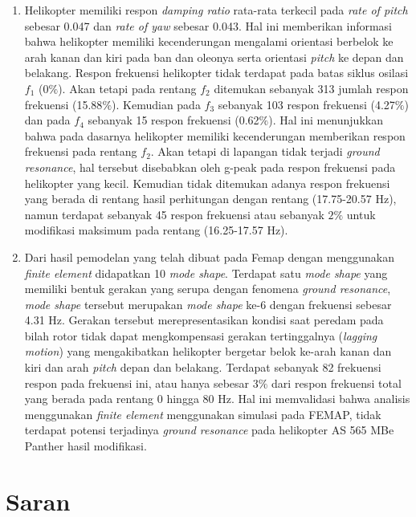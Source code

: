 \begin{enumerate}[nolistsep]
	\item Helikopter memiliki respon \textit{damping ratio} rata-rata terkecil pada \textit{rate of pitch} sebesar 0.047 dan \textit{rate of yaw} sebesar 0.043. Hal ini memberikan informasi bahwa helikopter memiliki kecenderungan mengalami orientasi berbelok ke arah kanan dan kiri pada ban dan oleonya serta orientasi \textit{pitch} ke depan dan belakang. Respon frekuensi helikopter tidak terdapat pada batas siklus osilasi $f_1$ (0$\%$). Akan tetapi pada rentang $f_2$ ditemukan sebanyak 313 jumlah respon frekuensi (15.88$\%$). Kemudian pada $f_3$ sebanyak 103 respon frekuensi (4.27$\%$) dan pada $f_4$ sebanyak 15 respon frekuensi (0.62$\%$). Hal ini menunjukkan bahwa pada dasarnya helikopter memiliki kecenderungan memberikan respon frekuensi pada rentang $f_2$. Akan tetapi di lapangan tidak terjadi \textit{ground resonance}, hal tersebut disebabkan oleh g-peak pada respon frekuensi pada helikopter yang kecil. Kemudian tidak ditemukan adanya respon frekuensi yang berada di rentang hasil perhitungan dengan rentang (17.75-20.57 Hz), namun terdapat sebanyak 45 respon frekuensi atau sebanyak $2\%$ untuk modifikasi maksimum pada rentang (16.25-17.57 Hz).
 
	\item Dari hasil pemodelan yang telah dibuat pada Femap dengan menggunakan \textit{finite element} didapatkan 10 \textit{mode shape}. Terdapat satu \textit{mode shape} yang memiliki bentuk gerakan yang serupa dengan fenomena \textit{ground resonance}, \textit{mode shape} tersebut merupakan \textit{mode shape} ke-6 dengan frekuensi sebesar 4.31 Hz. Gerakan tersebut merepresentasikan kondisi saat peredam pada bilah rotor tidak dapat mengkompensasi gerakan tertinggalnya (\textit{lagging motion}) yang mengakibatkan helikopter bergetar belok ke-arah kanan dan kiri dan arah \textit{pitch} depan dan belakang. Terdapat sebanyak 82 frekuensi respon pada frekuensi ini, atau hanya sebesar 3$\%$ dari respon frekuensi total yang berada pada rentang 0 hingga 80 Hz. Hal ini memvalidasi bahwa analisis menggunakan \textit{finite element} menggunakan simulasi pada FEMAP, tidak terdapat potensi terjadinya \textit{ground resonance} pada helikopter AS 565 MBe Panther hasil modifikasi.

\end{enumerate}

\section{Saran}
\label{chap:saran}

